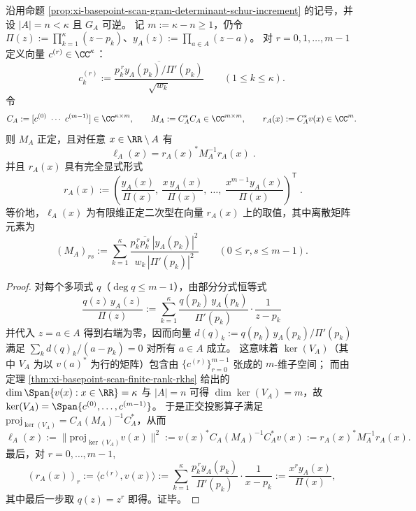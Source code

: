 \begin{theorem}\label{thm:xi-basepoint-scan-leverage-gap-general-codim-matrix}
沿用命题 \ref{prop:xi-basepoint-scan-gram-determinant-schur-increment} 的记号，并设 \(|A|=n<\kappa\) 且 \(G_A\) 可逆。
记 \(m:=\kappa-n\ge 1\)，仍令 \(\Pi(z):=\prod_{k=1}^{\kappa}(z-p_k)\)、\(y_A(z):=\prod_{a\in A}(z-a)\)。
对 \(r=0,1,\dots,m-1\) 定义向量 \(c^{(r)}\in\CC^\kappa\)：
\[
c^{(r)}_k:=\frac{\overline{p_k^{\,r}y_A(p_k)/\Pi'(p_k)}}{\sqrt{w_k}}
\qquad(1\le k\le\kappa).
\]
令
\[
C_A:=[c^{(0)}\ \cdots\ c^{(m-1)}]\in\CC^{\kappa\times m},
\qquad
M_A:=C_A^\ast C_A\in\CC^{m\times m},
\qquad
r_A(x):=C_A^\ast v(x)\in\CC^{m}.
\]
则 \(M_A\) 正定，且对任意 \(x\in\RR\setminus A\) 有
\[
\boxed{\;
\ell_A(x)=r_A(x)^\ast M_A^{-1}r_A(x)\; }.
\]
并且 \(r_A(x)\) 具有完全显式形式
\[
\boxed{\;
r_A(x)
:=\left(\frac{y_A(x)}{\Pi(x)},\ \frac{x\,y_A(x)}{\Pi(x)},\ \dots,\ \frac{x^{m-1}y_A(x)}{\Pi(x)}\right)^{\mathsf T}\; }.
\]
等价地，\(\ell_A(x)\) 为有限维正定二次型在向量 \(r_A(x)\) 上的取值，其中离散矩阵元素为
\[
(M_A)_{rs}
:=\sum_{k=1}^{\kappa}\frac{p_k^{\,r}\overline{p_k^{\,s}}\ |y_A(p_k)|^2}{w_k\,|\Pi'(p_k)|^2}
\qquad(0\le r,s\le m-1).
\]
\end{theorem}
\begin{proof}
对每个多项式 \(q\)（\(\deg q\le m-1\)），由部分分式恒等式
\[
\frac{q(z)\,y_A(z)}{\Pi(z)}
:=\sum_{k=1}^{\kappa}\frac{q(p_k)\,y_A(p_k)}{\Pi'(p_k)}\cdot\frac{1}{z-p_k}
\]
并代入 \(z=a\in A\) 得到右端为零，因而向量
\(
d(q)_k:=q(p_k)\,y_A(p_k)/\Pi'(p_k)
\)
满足 \(\sum_k d(q)_k/(a-p_k)=0\) 对所有 \(a\in A\) 成立。
这意味着 \(\ker(V_A)\)（其中 \(V_A\) 为以 \(v(a)^\ast\) 为行的矩阵）包含由 \(\{c^{(r)}\}_{r=0}^{m-1}\) 张成的 \(m\)-维子空间；
而由定理 \ref{thm:xi-basepoint-scan-finite-rank-rkhs} 给出的 \(\dim\Span\{v(x):x\in\RR\}=\kappa\) 与 \(|A|=n\) 可得 \(\dim\ker(V_A)=m\)，故
\(\ker(V_A)=\Span\{c^{(0)},\dots,c^{(m-1)}\}\)。
于是正交投影算子满足
\(
\mathrm{proj}_{\ker(V_A)}=C_A(M_A)^{-1}C_A^\ast
\)，从而
\[
\ell_A(x)
:=\|\mathrm{proj}_{\ker(V_A)}v(x)\|^2
:=v(x)^\ast C_A(M_A)^{-1}C_A^\ast v(x)
:=r_A(x)^\ast M_A^{-1}r_A(x).
\]
最后，对 \(r=0,\dots,m-1\),
\[
(r_A(x))_r
:=\langle c^{(r)},v(x)\rangle
:=\sum_{k=1}^{\kappa}\frac{p_k^{\,r}y_A(p_k)}{\Pi'(p_k)}\cdot\frac{1}{x-p_k}
:=\frac{x^r y_A(x)}{\Pi(x)},
\]
其中最后一步取 \(q(z)=z^r\) 即得。证毕。
\end{proof}

